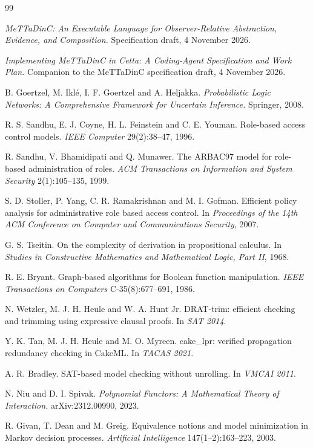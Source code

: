 \documentclass[11pt]{article}
\theoremstyle{definition}
\theoremstyle{plain}
\begin{document}
\begin{thebibliography}{99}\small

 \emph{MeTTaDinC: An Executable Language for Observer-Relative Abstraction, Evidence, and
Composition.} Specification draft, 4 November 2026.

 \emph{Implementing MeTTaDinC in Cetta: A Coding-Agent Specification and Work Plan.} Companion
to the MeTTaDinC specification draft, 4 November 2026.

 B. Goertzel, M. Ikl\'e, I. F. Goertzel and A. Heljakka. \emph{Probabilistic Logic
Networks: A Comprehensive Framework for Uncertain Inference.} Springer, 2008.

 R. S. Sandhu, E. J. Coyne, H. L. Feinstein and C. E. Youman. Role-based access control
models. \emph{IEEE Computer} 29(2):38--47, 1996.

 R. Sandhu, V. Bhamidipati and Q. Munawer. The ARBAC97 model for role-based
administration of roles. \emph{ACM Transactions on Information and System Security} 2(1):105--135, 1999.

 S. D. Stoller, P. Yang, C. R. Ramakrishnan and M. I. Gofman. Efficient policy analysis
for administrative role based access control. In \emph{Proceedings of the 14th ACM Conference on
Computer and Communications Security}, 2007.

 G. S. Tseitin. On the complexity of derivation in propositional calculus. In
\emph{Studies in Constructive Mathematics and Mathematical Logic, Part II}, 1968.

 R. E. Bryant. Graph-based algorithms for Boolean function manipulation. \emph{IEEE
Transactions on Computers} C-35(8):677--691, 1986.

 N. Wetzler, M. J. H. Heule and W. A. Hunt Jr. DRAT-trim: efficient checking and
trimming using expressive clausal proofs. In \emph{SAT 2014}.

 Y. K. Tan, M. J. H. Heule and M. O. Myreen. cake\_lpr: verified propagation redundancy
checking in CakeML. In \emph{TACAS 2021}.

 A. R. Bradley. SAT-based model checking without unrolling. In \emph{VMCAI 2011}.

 N. Niu and D. I. Spivak. \emph{Polynomial Functors: A Mathematical Theory of
Interaction.} arXiv:2312.00990, 2023.

 R. Givan, T. Dean and M. Greig. Equivalence notions and model minimization in Markov
decision processes. \emph{Artificial Intelligence} 147(1--2):163--223, 2003.


\end{thebibliography}
\end{document}
